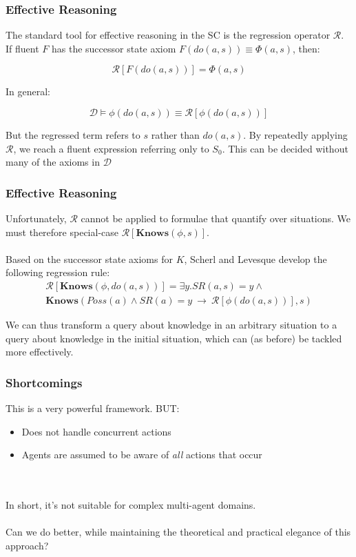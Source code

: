 \documentclass{beamer}
\begin{document}
\begin{frame}
\frametitle{Effective Reasoning}
The standard tool for effective reasoning in the SC is the
regression operator $\mathcal{R}$. If fluent $F$ has the successor state axiom
$F(do(a,s)) \equiv \Phi(a,s)$, then:

\[ \mathcal{R}[F(do(a,s))] = \Phi(a,s) \]

\pause
In general:

\[  \mathcal{D} \models \phi(do(a,s)) \equiv \mathcal{R}[\phi(do(a,s))] \]

But the regressed term refers to $s$ rather than $do(a,s)$.
By repeatedly applying $\mathcal{R}$, we reach a fluent expression referring
only to $S_0$.  This can be decided without many of the axioms in $\mathcal{D}$

\end{frame}

\begin{frame}
\frametitle{Effective Reasoning}
Unfortunately, $\mathcal{R}$ cannot be applied to formulae that quantify
over situations.  We must therefore special-case
$\mathcal{R}[\mathbf{Knows}(\phi,s)]$.
\ \\
\ \\
Based on the successor state axioms for $K$, Scherl and Levesque develop
the following regression rule:
\begin{multline*}
  \mathcal{R}[\mathbf{Knows}(\phi,do(a,s))] =
    \exists y . SR(a,s) = y \wedge \\
    \mathbf{Knows}(Poss(a) \wedge SR(a)=y\ \rightarrow\ \mathcal{R}[\phi(do(a,s))],s)
\end{multline*}

We can thus transform a query about knowledge in an arbitrary situation to
a query about knowledge in the initial situation, which can (as before) be
tackled more effectively.

\end{frame}

\begin{frame}
\frametitle{Shortcomings}
This is a very powerful framework.  BUT:
\begin{itemize}
 \item Does not handle concurrent actions
 \item Agents are assumed to be aware of \emph{all} actions that occur
\end{itemize}
\ \\
\ \\
\pause
In short, it's not suitable for complex multi-agent domains.
\ \\
\ \\
Can we do better, while maintaining the theoretical and practical elegance
of this approach?
\end{frame}
\end{document}
